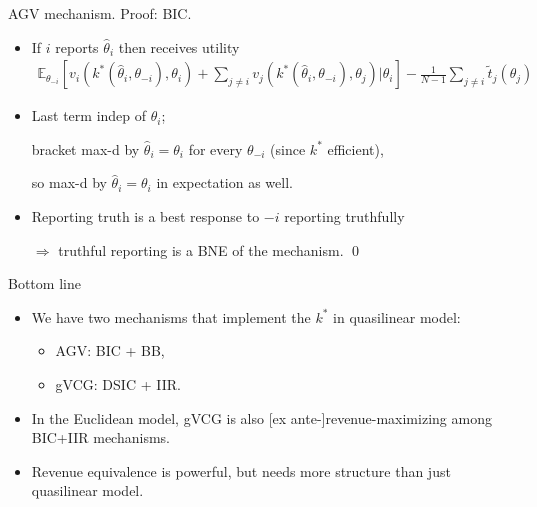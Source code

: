 \documentclass[english,10pt
,aspectratio=169
,handout
]{beamer}
\begin{document}
\begin{frame}{AGV mechanism. Proof: BIC.}
\begin{itemize}
	\item If $i$ reports $\hat{\theta}_i$ then receives utility
	{\footnotesize 
		\vspace{-0.5em}\begin{align*}
			\mathbb{E}_{\theta_{-i}} \left[ v_i(k^*(\hat{\theta}_i, \theta_{-i}), \theta_i) + \sum_{j \neq i} v_j(k^*(\hat{\theta}_i, \theta_{-i}), \theta_j) | \theta_i \right] - \frac{1}{N-1} \sum_{j \neq i} \tilde{t}_j (\theta_j)
		\end{align*}
	}
	\item Last term indep of $\hat{\theta}_i$; 
	
	bracket max-d by $\hat{\theta}_i = \theta_i$ for every $\theta_{-i}$ (since $k^*$ efficient), 
	
	so max-d by $\hat{\theta}_i = \theta_i$ in expectation as well.
	
	\item Reporting truth is a best response to $-i$ reporting truthfully 
	
	$\Rightarrow$ truthful reporting is a BNE of the mechanism. \qed
\end{itemize}
\end{frame}





\begin{frame}{Bottom line}
\begin{itemize}
	\item We have two mechanisms that implement the  $k^*$ in \alert{quasilinear} model:
	\begin{itemize}
		\item AGV: BIC + BB,
		\item gVCG: DSIC + IIR.
	\end{itemize}
	\item In the \alert{Euclidean} model, gVCG is also [ex ante-]revenue-maximizing among BIC+IIR mechanisms.
	\item Revenue equivalence is powerful, but needs more structure than just quasilinear model.
\end{itemize}
\end{frame}




\end{document}
